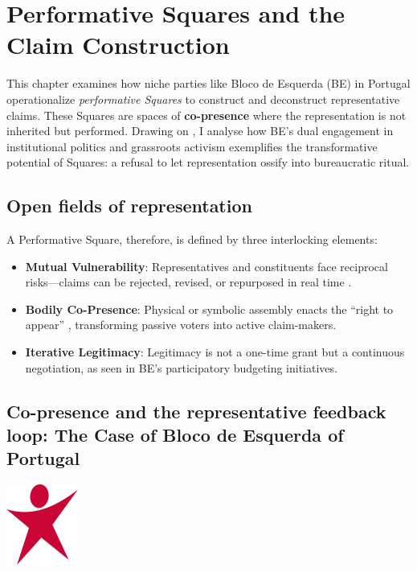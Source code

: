 \chapter{Performative Squares and the Claim Construction}\label{chap:Performative Squares and the Claim Construction} %
This chapter examines how niche parties like Bloco de Esquerda (BE) in Portugal operationalize \textit{performative Squares} to construct and deconstruct representative claims. These Squares  are spaces of \textbf{co-presence} where the representation is not inherited but performed. Drawing on \cite{kim2024}, I analyse how BE’s dual engagement in institutional politics and grassroots activism exemplifies the transformative potential of Squares: a refusal to let representation ossify into bureaucratic ritual.

\section{Open fields of representation}\label{sec:Open fields of representation} %

A Performative Square, therefore, is defined by three interlocking elements:
\begin{itemize}
	\item \textbf{Mutual Vulnerability}: Representatives and constituents face reciprocal risks—claims can be rejected, revised, or repurposed in real time \parencite[5]{saward2024}.
	\item \textbf{Bodily Co-Presence}: Physical or symbolic assembly enacts the \enquote{right to appear} \parencite[7]{kim2024}, transforming passive voters into active claim-makers.
	\item \textbf{Iterative Legitimacy}: Legitimacy is not a one-time grant but a continuous negotiation, as seen in BE’s participatory budgeting initiatives.
\end{itemize}


\section{Co-presence and the representative feedback loop: The Case of Bloco de Esquerda of Portugal}\label{sec:Co-presence and the representative feedback loop: The Case of Left Bloc} %
\begin{marginfigure}
	\includegraphics{LeftBloc.svg.png}
\end{marginfigure}


